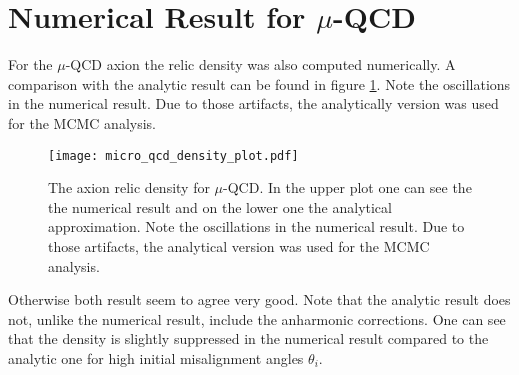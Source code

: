 \documentclass[twoside,a4paper, 12pt]{article}
\numberwithin{equation}{section}
\begin{document}
\section{Numerical Result for $\mu$-QCD}
\label{sec:numerical_micro_qcd}
For the $\mu$-QCD axion the relic density was also computed numerically.
A comparison with the analytic result can be found in figure \ref{fig:micro_qcd_density_plot}.
Note the oscillations in the numerical result. Due to those artifacts, the analytically version was used for the MCMC analysis. 
\begin{figure}[H]
    \centering
    \texttt{[image: micro\_qcd\_density\_plot.pdf]}
    \caption{The axion relic density for $\mu$-QCD. In the upper plot one can see the the numerical result and on the lower one the analytical approximation.
    Note the oscillations in the numerical result. Due to those artifacts, the analytical version was used
    for the MCMC analysis.}
    \label{fig:micro_qcd_density_plot}
\end{figure}
Otherwise both result seem to agree very good.
Note that the analytic result does not, unlike the numerical result, include the anharmonic corrections. One can see that the density is slightly suppressed in the numerical result compared to
the analytic one for high initial misalignment angles $\theta_i$.



\newpage
\end{document}
